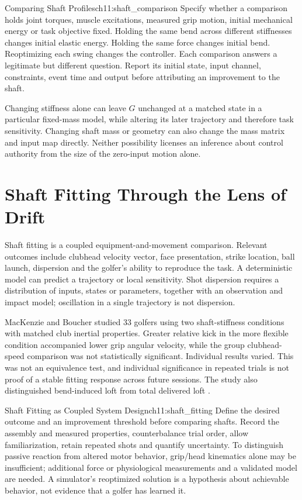 \begin{example}{Comparing Shaft Profiles}{ch11:shaft_comparison}
Specify whether a comparison holds joint torques, muscle excitations, measured grip motion, initial mechanical energy or task objective fixed. Holding the same bend across different stiffnesses changes initial elastic energy. Holding the same force changes initial bend. Reoptimizing each swing changes the controller. Each comparison answers a legitimate but different question. Report its initial state, input channel, constraints, event time and output before attributing an improvement to the shaft.
\end{example}

Changing stiffness alone can leave $G$ unchanged at a matched state in a particular fixed-mass model, while altering its later trajectory and therefore task sensitivity. Changing shaft mass or geometry can also change the mass matrix and input map directly. Neither possibility licenses an inference about control authority from the size of the zero-input motion alone.

\section{Shaft Fitting Through the Lens of Drift}
Shaft fitting is a coupled equipment-and-movement comparison. Relevant outcomes include clubhead velocity vector, face presentation, strike location, ball launch, dispersion and the golfer's ability to reproduce the task. A deterministic model can predict a trajectory or local sensitivity. Shot dispersion requires a distribution of inputs, states or parameters, together with an observation and impact model; oscillation in a single trajectory is not dispersion.

MacKenzie and Boucher studied 33 golfers using two shaft-stiffness conditions with matched club inertial properties. Greater relative kick in the more flexible condition accompanied lower grip angular velocity, while the group clubhead-speed comparison was not statistically significant. Individual results varied. This was not an equivalence test, and individual significance in repeated trials is not proof of a stable fitting response across future sessions. The study also distinguished bend-induced loft from total delivered loft \citep{mackenzie2017shaft}.

\begin{principle}{Shaft Fitting as Coupled System Design}{ch11:shaft_fitting}
Define the desired outcome and an improvement threshold before comparing shafts. Record the assembly and measured properties, counterbalance trial order, allow familiarization, retain repeated shots and quantify uncertainty. To distinguish passive reaction from altered motor behavior, grip/head kinematics alone may be insufficient; additional force or physiological measurements and a validated model are needed. A simulator's reoptimized solution is a hypothesis about achievable behavior, not evidence that a golfer has learned it.
\end{principle}

